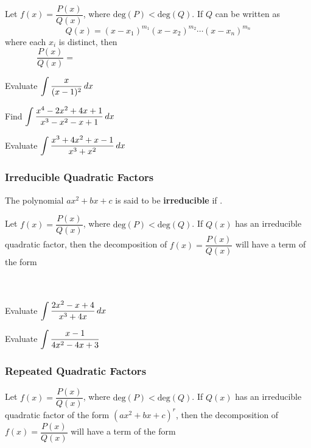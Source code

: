 \documentclass[notes]{subfiles}
\begin{document}
		\begin{rmk}
			Let $f(x) = \dfrac{P(x)}{Q(x)}$, where $\text{deg}(P) < \text{deg}(Q)$.  If $Q$ can be written as
				\[Q(x) =(x-x_1)^{m_1}(x-x_2)^{m_2}\cdots (x-x_n)^{m_n}\]
			where each $x_i$ is distinct, then
				\[\dfrac{P(x)}{Q(x)} = \hspace{4in}\]
		\end{rmk}
		\begin{ex}
			Evaluate $\displaystyle \int \dfrac{x}{(x-1)^2}\, dx$
		\end{ex}
			\newpage
			
		\begin{ex}
			Find $\displaystyle \int \dfrac{x^4-2x^2+4x+1}{x^3-x^2-x+1}\, dx$
		\end{ex}
			
		\begin{ex}
			Evaluate $\displaystyle \int \dfrac{x^3+4x^2+x-1}{x^3+x^2}\, dx$
		\end{ex}
			\newpage
			
	\subsubsection*{Irreducible Quadratic Factors}
		\begin{defn}
			The polynomial $ax^2 + bx + c$ is said to be \textbf{irreducible} if .
		\end{defn}
		\begin{rmk}
			Let $f(x) = \dfrac{P(x)}{Q(x)}$, where $\text{deg}(P) < \text{deg}(Q)$.  If $Q(x)$ has an irreducible quadratic factor, then the decomposition of $f(x) = \dfrac{P(x)}{Q(x)}$ will have a term of the form
			\\ \\ \\
		\end{rmk}
		\begin{ex}
			Evaluate $\displaystyle \int \dfrac{2x^2-x+4}{x^3 + 4x}\, dx$
		\end{ex}
			\newpage
			
		\begin{ex}
			Evaluate $\displaystyle \int \dfrac{x-1}{4x^2-4x+3}$
		\end{ex}
			\newpage
			
	\subsubsection*{Repeated Quadratic Factors}
		\begin{rmk}
			Let $f(x) = \dfrac{P(x)}{Q(x)}$, where $\text{deg}(P) < \text{deg}(Q)$.  If $Q(x)$ has an irreducible quadratic factor of the form $(ax^2 + bx + c)^r$, then the decomposition of $f(x) = \dfrac{P(x)}{Q(x)}$ will have a term of the form \\ \\ \\
		\end{rmk}
		
\end{document}

